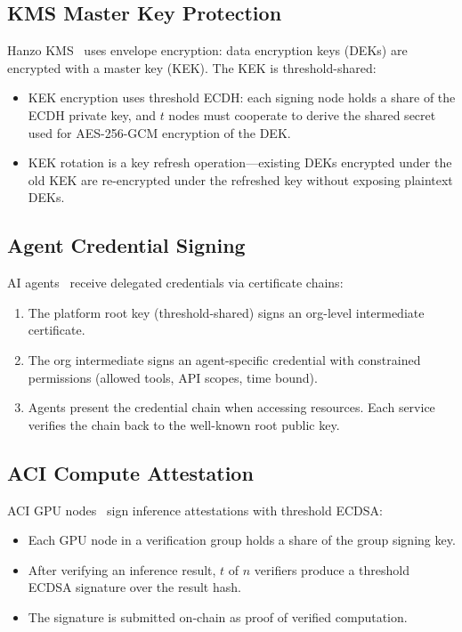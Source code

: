 \documentclass[11pt]{article}
\begin{document}
\subsection{KMS Master Key Protection}

Hanzo KMS~\cite{hanzokms} uses envelope encryption: data encryption keys (DEKs)
are encrypted with a master key (KEK). The KEK is threshold-shared:
\begin{itemize}[leftmargin=1.1em]
    \item KEK encryption uses threshold ECDH: each signing node holds a share
    of the ECDH private key, and $t$ nodes must cooperate to derive the shared
    secret used for AES-256-GCM encryption of the DEK.
    \item KEK rotation is a key refresh operation---existing DEKs encrypted
    under the old KEK are re-encrypted under the refreshed key without
    exposing plaintext DEKs.
\end{itemize}

\subsection{Agent Credential Signing}

AI agents~\cite{hanzoagentsdk} receive delegated credentials via certificate
chains:
\begin{enumerate}[leftmargin=1.4em]
    \item The platform root key (threshold-shared) signs an org-level
    intermediate certificate.
    \item The org intermediate signs an agent-specific credential with
    constrained permissions (allowed tools, API scopes, time bound).
    \item Agents present the credential chain when accessing resources. Each
    service verifies the chain back to the well-known root public key.
\end{enumerate}

\subsection{ACI Compute Attestation}

ACI GPU nodes~\cite{hanzoaci} sign inference attestations with threshold ECDSA:
\begin{itemize}[leftmargin=1.1em]
    \item Each GPU node in a verification group holds a share of the group
    signing key.
    \item After verifying an inference result, $t$ of $n$ verifiers produce a
    threshold ECDSA signature over the result hash.
    \item The signature is submitted on-chain as proof of verified computation.
\end{itemize}
\end{document}
